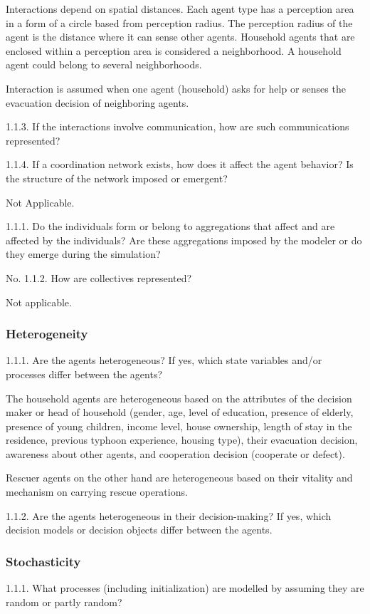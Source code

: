 \documentclass[runningheads]{llncs}
\begin{document}
Interactions depend on spatial distances. Each agent type has a perception area in a form of a circle based from perception radius. The perception radius of the agent is the distance where it can sense other agents. Household agents that are enclosed within a perception area is considered a neighborhood. A household agent could belong to several neighborhoods.

Interaction is assumed when one agent (household) asks for help or senses the evacuation decision of neighboring agents. 

1.1.3.	If the interactions involve communication, how are such communications represented?


1.1.4.	If a coordination network exists, how does it affect the agent behavior? Is the structure of the network imposed or emergent?

Not Applicable.

1.1.1.	Do the individuals form or belong to aggregations that affect and are affected by the individuals? Are these aggregations imposed by the modeler or do they emerge during the simulation?

No.
1.1.2.	How are collectives represented?

Not applicable.

\subsubsection{Heterogeneity}
1.1.1.	Are the agents heterogeneous? If yes, which state variables and/or processes differ between the agents?

The household agents are heterogeneous based on the attributes of the decision maker or head of household (gender, age, level of education, presence of elderly, presence of young children, income level, house ownership, length of stay in the residence, previous typhoon experience, housing type), their evacuation decision, awareness about other agents, and cooperation decision (cooperate or defect).

Rescuer agents on the other hand are heterogeneous based on their vitality and mechanism on carrying rescue operations.
 
1.1.2.	Are the agents heterogeneous in their decision-making? If yes, which decision models or decision objects differ between the agents.

\subsubsection{Stochasticity}
1.1.1.	What processes (including initialization) are modelled by assuming they are random or partly random?
\end{document}
